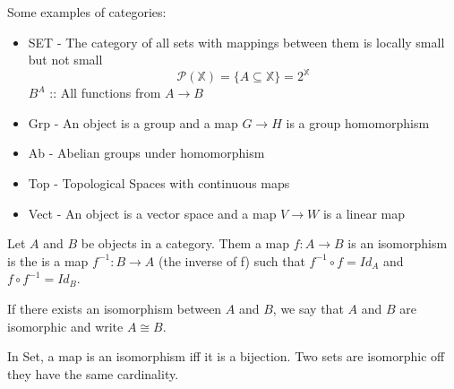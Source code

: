 \documentclass[../../notes.tex]{subfiles}
\begin{document}
Some examples of categories:
\begin{itemize}
\item SET - The category of all sets with mappings between them is locally small but not small
  $$ \mathcal{P}(\mathbb{X}) = \{A \subseteq \mathbb{X}\} = 2^{\mathbb{X}} $$
  $ B^A $ :: All functions from $A \rightarrow B $
\item Grp - An object is a group and a map $ G \rightarrow H $ is a group homomorphism
\item Ab - Abelian groups under homomorphism
\item Top - Topological Spaces with continuous maps
\item Vect - An object is a vector space and a map $ V \rightarrow W $ is a linear map

\end{itemize}

\begin{definition}
  Let $A$ and $B$ be objects in a category. Them a map $f : A \rightarrow B$ is an
  isomorphism is the is a map $ f^{-1}  : B \rightarrow A $ (the inverse of f) such that
  $f^{-1} \circ f = Id_A $ and $f \circ f^{-1} = Id_B$.

  If there exists an isomorphism between $A$ and $B$,
  we say that $A$ and $B$ are isomorphic and write $A \cong B$.
\end{definition}

\begin{proposition}
  In Set, a map is an isomorphism iff it is a bijection. Two sets are isomorphic
  off they have the same cardinality.
\end{proposition}
\end{document}
